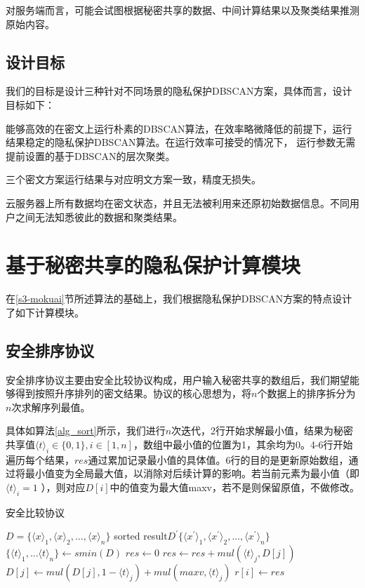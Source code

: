 对服务端而言，可能会试图根据秘密共享的数据、中间计算结果以及聚类结果推测原始内容。
\subsection{设计目标}
我们的目标是设计三种针对不同场景的隐私保护DBSCAN方案，具体而言，设计目标如下：

\begin{compactitem}
	\item 能够高效的在密文上运行朴素的DBSCAN算法，在效率略微降低的前提下，运行结果稳定的隐私保护DBSCAN算法。在运行效率可接受的情况下， 运行参数无需提前设置的基于DBSCAN的层次聚类。
	\item 三个密文方案运行结果与对应明文方案一致，精度无损失。
	\item 云服务器上所有数据均在密文状态，并且无法被利用来还原初始数据信息。不同用户之间无法知悉彼此的数据和聚类结果。
\end{compactitem}
\section{基于秘密共享的隐私保护计算模块}
\label{s4-subpro}
在\ref{s3-mokuai}节所述算法的基础上，我们根据隐私保护DBSCAN方案的特点设计了如下计算模块。
\subsection{安全排序协议}
安全排序协议主要由安全比较协议构成，用户输入秘密共享的数组后，我们期望能够得到按照升序排列的密文结果。协议的核心思想为，将$ n $个数据上的排序拆分为$ n $次求解序列最值。

具体如算法\ref{alg_sort}所示，我们进行$ n $次迭代，2行开始求解最小值，结果为秘密共享值$ \langle t \rangle_i \in \{0,1\}, i\in[1,n] $，数组中最小值的位置为1，其余均为0。4-6行开始遍历每个结果，$ res $通过累加记录最小值的具体值。6行的目的是更新原始数组，通过将最小值变为全局最大值，以消除对后续计算的影响。若当前元素为最小值（即$\langle t \rangle_i=1  $ ），则对应$ D[i] $中的值变为最大值maxv，若不是则保留原值，不做修改。
\begin{algorithm}[htbp]
	\renewcommand{\algorithmicrequire}{\textbf{输入:}}
	\renewcommand{\algorithmicensure}{\textbf{输出:}}
	\caption{安全比较协议}
	\label{alg_sort}
	\begin{algorithmic}[1]
		\REQUIRE $ D = \{\langle x\rangle_1, \langle x\rangle_2,...,\langle x\rangle_n\} $
		\ENSURE sorted result$ D^{\prime}\{\langle x^{\prime}\rangle_1, \langle x^{\prime}\rangle_2,...,\langle x^{\prime}\rangle_n\} $
		\STATE $ \{\langle t\rangle_1,...\langle t \rangle_n\} \leftarrow smin(D)$
		\STATE $ res \leftarrow 0 $
		\STATE $ res \leftarrow res + mul(\langle t \rangle_j, D[j]) $ 
		\STATE $ D[j] \leftarrow mul(D[j],1-\langle t \rangle_j) + mul(maxv, \langle t \rangle_j)$
		\ENDFOR
		\STATE $ r[i] \leftarrow res $
		\ENDFOR
	\end{algorithmic}
\end{algorithm}
